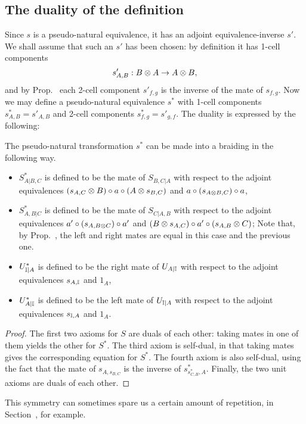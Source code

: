 \subsection{The duality of the definition}
Since $s$ is a pseudo-natural equivalence, it has an adjoint
equivalence-inverse $s'$. We shall assume that such an $s'$
has been chosen: by definition it has 1-cell components
\[
	s'_{A,B}: B\tn A \to A\tn B,
\]
and by Prop.~ each 2-cell component $s'_{f,g}$
is the inverse of the mate of $s_{f,g}$. Now we may define
a pseudo-natural equivalence $s^*$ with 1-cell components
$s^*_{A,B} = s'_{A,B}$ and 2-cell components $s^{*}_{f,g} = s'_{g,f}$.
The duality is expressed by the following:
\begin{propn}
	The pseudo-natural transformation $s^{*}$ can be made into
	a braiding in the following way.
	\begin{itemize}
		\item $S^{*}_{A|B,C}$ is defined to be the mate of $S_{B,C|A}$
			with respect to the adjoint equivalences
			$(s_{A,C}\tn B)\o a\o(A\tn s_{B,C})$
			and $a\o(s_{A\tn B,C})\o a$,
		\item $S^{*}_{A,B|C}$ is defined to be the mate of $S_{C|A,B}$
			with respect to the adjoint equivalences
			$a'\o(s_{A,B\tn C})\o a'$ and $(B\tn s_{A,C})\o a'\o (s_{A,B}\tn C)$;
			Note that, by Prop.~, the
			left and right mates are equal in this case and the previous one.
		\item $U^{*}_{{\mathbb{I}}|A}$ is defined to be the right mate of $U_{A|{\mathbb{I}}}$
			with respect to the adjoint equivalences $s_{A,{\mathbb{I}}}$ and $1_{A}$,
		\item $U^{*}_{A|{\mathbb{I}}}$ is defined to be the left mate of $U_{{\mathbb{I}}|A}$
			with respect to the adjoint equivalences $s_{{\mathbb{I}},A}$ and $1_{A}$.
	\end{itemize}
\end{propn}
\begin{proof}
	The first two axioms for $S$ are duals of each other: taking mates in
	one of them yields the other for $S^{*}$. The third axiom is self-dual,
	in that taking mates gives the corresponding equation for $S^{*}$.
	The fourth axiom is also self-dual, using the fact that the mate of
	$s_{A,s_{B,C}}$ is the inverse of ${s^*_{s^*_{C,B},A}}$. Finally, the
	two unit axioms are duals of each other.
\end{proof}

This symmetry can sometimes spare us a certain amount of repetition,
in Section~, for example.

